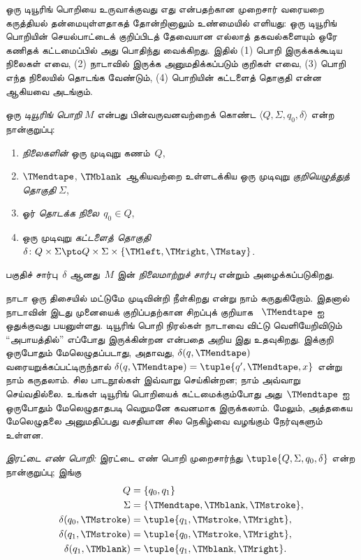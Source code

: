 \documentclass[../../../include/open-logic-section]{subfiles}
\begin{document}


\begin{explain}
ஒரு டியூரிங் பொறியை உருவாக்குவது எது என்பதற்கான முறைசார் வரையறை
கருத்தியல் தன்மையுள்ளதாகத் தோன்றினாலும் உண்மையில் எளியது: ஒரு டியூரிங்
பொறியின் செயல்பாட்டைக் குறிப்பிடத் தேவையான எல்லாத் தகவல்களையும் ஒரே
கணிதக் கட்டமைப்பில் அது பொதிந்து வைக்கிறது. இதில் (1) பொறி இருக்கக்கூடிய
நிலைகள் எவை, (2) நாடாவில் இருக்க அனுமதிக்கப்படும் குறிகள் எவை, (3) பொறி
எந்த நிலையில் தொடங்க வேண்டும், (4) பொறியின் கட்டளைத் தொகுதி என்ன ஆகியவை
அடங்கும்.
\end{explain}

\begin{defn}[டியூரிங் பொறி]
ஒரு \emph{டியூரிங் பொறி} $M$ என்பது பின்வருவனவற்றைக் கொண்ட
$\langle Q, \Sigma, q_0, \delta\rangle$ என்ற நான்குறுப்பு:
\begin{enumerate}
\item \emph{நிலைகளின்} ஒரு முடிவுறு கணம்~$Q$,
\item $\TMendtape$, $\TMblank$ ஆகியவற்றை உள்ளடக்கிய ஒரு முடிவுறு
  \emph{குறியெழுத்துத் தொகுதி} $\Sigma$,
\item ஓர் \emph{தொடக்க நிலை}~$q_0 \in Q$,
\item ஒரு முடிவுறு \emph{கட்டளைத் தொகுதி}~$\delta\colon Q \times \Sigma
  \pto Q \times \Sigma \times \{\TMleft, \TMright, \TMstay\}$.
\end{enumerate}
பகுதிச் சார்பு~$\delta$ ஆனது~$M$ இன் \emph{நிலைமாற்றுச் சார்பு}
என்றும் அழைக்கப்படுகிறது.
\end{defn}

\begin{explain}
நாடா ஒரு திசையில் மட்டுமே முடிவின்றி நீள்கிறது என்று நாம் கருதுகிறோம்.
இதனால் நாடாவின் இடது முனையைக் குறிப்பதற்கான சிறப்புக் குறியாக
~$\TMendtape$ ஐ ஒதுக்குவது பயனுள்ளது. டியூரிங் பொறி நிரல்கள் நாடாவை
விட்டு வெளியேறிவிடும் ``அபாயத்தில்'' எப்போது இருக்கின்றன என்பதை அறிய
இது உதவுகிறது. இக்குறி ஒருபோதும் மேலெழுதப்படாது, அதாவது,
$\delta(q,\TMendtape)$ வரையறுக்கப்பட்டிருந்தால்
$\delta(q,\TMendtape) = \tuple{q', \TMendtape, x}$ என்று நாம்
கருதலாம். சில பாடநூல்கள் இவ்வாறு செய்கின்றன; நாம் அவ்வாறு செய்வதில்லை.
உங்கள் டியூரிங் பொறியைக் கட்டமைக்கும்போது அது~$\TMendtape$ ஐ ஒருபோதும்
மேலெழுதாதபடி வெறுமனே கவனமாக இருக்கலாம். மேலும், அத்தகைய மேலெழுதலை
அனுமதிப்பது வசதியான சில நெகிழ்வை வழங்கும் நேர்வுகளும் உள்ளன.
\end{explain}

\begin{ex}
\emph{இரட்டை எண் பொறி:} இரட்டை எண் பொறி முறைசார்ந்து
$\tuple{Q, \Sigma, q_0, \delta}$ என்ற நான்குறுப்பு; இங்கு
\begin{align*}
Q & = \{ q_0, q_1 \} \\
\Sigma & = \{ \TMendtape, \TMblank, \TMstroke \}, \\
\delta(q_0, \TMstroke) & = \tuple{q_1, \TMstroke, \TMright},\\
\delta(q_1, \TMstroke) & = \tuple{q_0, \TMstroke, \TMright},\\
\delta(q_1, \TMblank)  & = \tuple{q_1, \TMblank, \TMright}.
\end{align*}
\end{ex}
\end{document}
